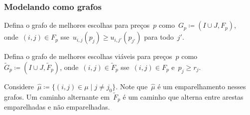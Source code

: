 \documentclass[10pt, compress]{beamer}
\begin{document}
\begin{frame}[fragile]
	\frametitle{Modelando como grafos}

	Defina o \alert{grafo de melhores escolhas} para preços~$p$ como~$G_p \coloneqq (I \cup J, F_p)$, onde~$(i, j) \in F_p$ sse~${u_{i, j}(p_j) \geq u_{i, j'}(p_{j'})}$ para todo~$j'$.
	\vfill

	Defina o \alert{grafo de melhores escolhas viáveis} para preços~$p$ como~$\tilde{G}_p \coloneqq (I \cup J, \tilde{F}_p)$, onde~$(i, j) \in \tilde{F}_p$ sse~$(i, j) \in F_p$ e~$p_j \geq r_j$.
	\vfill

	Considere~$\hat{\mu} \coloneqq \{(i, j) \in \mu \mid j \neq j_0\}$. Note que~$\hat{\mu}$ é um emparelhamento nesses grafos. Um \alert{caminho alternante} em~$\tilde{F}_p$ é um caminho que alterna entre arestas emparelhadas e não emparelhadas.

\end{frame}
\end{document}
